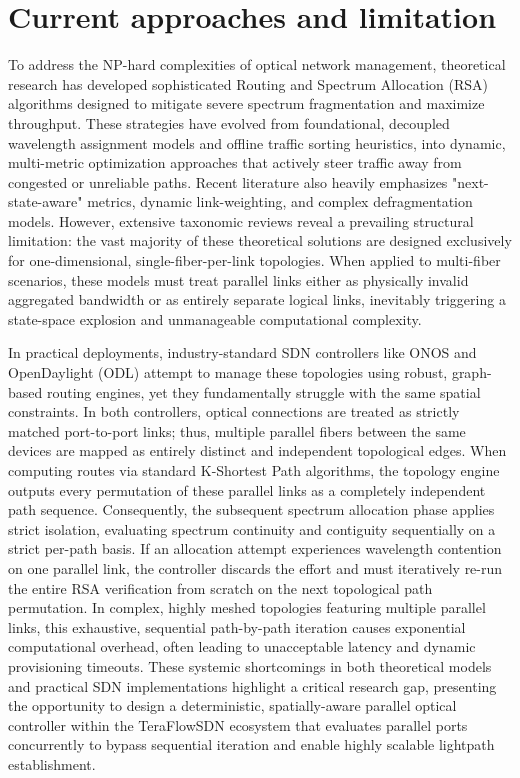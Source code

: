 \section{Current approaches and limitation}
To address the NP-hard complexities of optical network management, theoretical research has developed sophisticated Routing and Spectrum Allocation (RSA) algorithms designed to mitigate severe spectrum fragmentation and maximize throughput. These strategies have evolved from foundational, decoupled wavelength assignment models and offline traffic sorting heuristics, into dynamic, multi-metric optimization approaches that actively steer traffic away from congested or unreliable paths. Recent literature also heavily emphasizes "next-state-aware" metrics, dynamic link-weighting, and complex defragmentation models. However, extensive taxonomic reviews reveal a prevailing structural limitation: the vast majority of these theoretical solutions are designed exclusively for one-dimensional, single-fiber-per-link topologies. When applied to multi-fiber scenarios, these models must treat parallel links either as physically invalid aggregated bandwidth or as entirely separate logical links, inevitably triggering a state-space explosion and unmanageable computational complexity.

In practical deployments, industry-standard SDN controllers like ONOS\cite{odtnONOS} and OpenDaylight (ODL)\cite{odlTPCE} attempt to manage these topologies using robust, graph-based routing engines, yet they fundamentally struggle with the same spatial constraints. In both controllers, optical connections are treated as strictly matched port-to-port links; thus, multiple parallel fibers between the same devices are mapped as entirely distinct and independent topological edges. When computing routes via standard K-Shortest Path algorithms, the topology engine outputs every permutation of these parallel links as a completely independent path sequence. Consequently, the subsequent spectrum allocation phase applies strict isolation, evaluating spectrum continuity and contiguity sequentially on a strict per-path basis. If an allocation attempt experiences wavelength contention on one parallel link, the controller discards the effort and must iteratively re-run the entire RSA verification from scratch on the next topological path permutation. In complex, highly meshed topologies featuring multiple parallel links, this exhaustive, sequential path-by-path iteration causes exponential computational overhead, often leading to unacceptable latency and dynamic provisioning timeouts. These systemic shortcomings in both theoretical models and practical SDN implementations highlight a critical research gap, presenting the opportunity to design a deterministic, spatially-aware parallel optical controller within the TeraFlowSDN ecosystem that evaluates parallel ports concurrently to bypass sequential iteration and enable highly scalable lightpath establishment.
